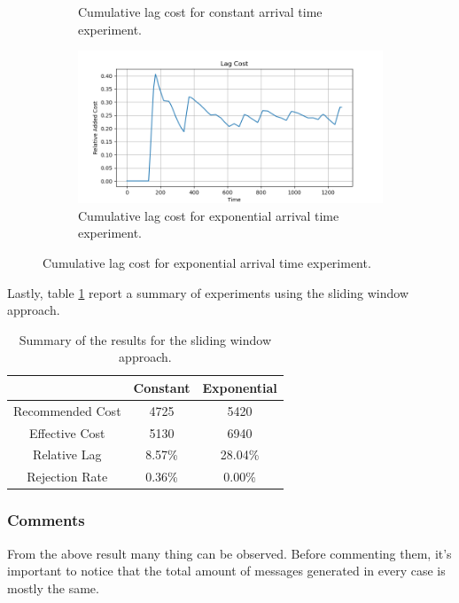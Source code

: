 \begin{figure}[H]
\begin{subfigure}{0.49\linewidth}
	    \caption{Cumulative lag cost for constant arrival time experiment.}
	    \label{fig:sliding_window_constant_lag}
	\end{subfigure}
	\begin{subfigure}{0.49\linewidth}
	    \centering
	    \includegraphics[width=1\linewidth]{images/sliding_window/exponential/lag_cost_cumulative.png}
	    \caption{Cumulative lag cost for exponential arrival time experiment.}
	    \label{fig:sliding_window_exponential_lag}
	\end{subfigure}
\end{figure}

Lastly, table \ref{tab:sliding_window_summary} report a summary of experiments using the sliding window approach.

\begin{table}[h]
	\centering
	\begin{tabular}{|c|c|c|}
		\hline
		& Constant & Exponential \\
		\hline
		Recommended Cost & 4725 & 5420 \\
		\hline
		Effective Cost & 5130 & 6940 \\
		\hline
		Relative Lag & 8.57\% & 28.04\%  \\
		\hline
		Rejection Rate & 0.36\% & 0.00\% \\
		\hline
	\end{tabular}
	\caption{Summary of the results for the sliding window approach.}
	\label{tab:sliding_window_summary}
\end{table}

\subsubsection{Comments}
From the above result many thing can be observed. Before commenting them, it's important to notice that the total amount of messages generated in every case is mostly the same.

